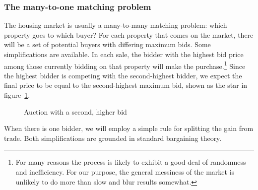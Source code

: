 

\subsubsection{The many-to-one matching problem}
{The housing market is usually a many-to-many matching problem}: which property goes to which buyer? For each property that comes on the market, there will be a set of potential buyers with differing maximum bids. Some simplifications are available. In each sale, the bidder with the highest bid price among those currently bidding on that property will make the purchase.\footnote{For many reasons the process is likely to exhibit a good deal of randomness and inefficiency. For our purpose, the general messiness of the market is unlikely to do more than slow and blur results somewhat.} Since the highest bidder is competing with the second-highest bidder, we expect the final price to be equal to the second-highest maximum bid, shown as the star in figure~\ref{fig:auction-game}. 


    \begin{figure}
        \centering
        
        \caption{Auction with a second, higher bid}
        \label{fig:auction-game}
    \end{figure}

When there is one bidder, we will employ a simple rule for splitting the gain from trade. Both simplifications are grounded in standard bargaining theory.

